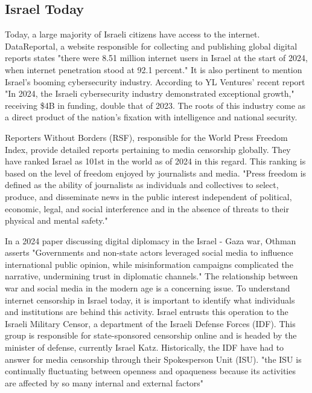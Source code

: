 \subsection{Israel Today}
Today, a large majority of Israeli citizens have access to the internet. DataReportal, a website responsible for collecting and publishing global digital reports states "there were 8.51 million internet users in Israel at the start of 2024, when internet penetration stood at 92.1 percent." \cite{Digital2024Israel} It is also pertinent to mention Israel's booming cybersecurity industry. According to YL Ventures' recent report "In 2024, the Israeli cybersecurity industry demonstrated exceptional growth," receiving \$4B in funding, double that of 2023. The roots of this industry come as a direct product of the nation's fixation with intelligence and national security. 


Reporters Without Borders (RSF), responsible for the World Press Freedom Index, provide detailed reports pertaining to media censorship globally. They have ranked Israel as 101st in the world as of 2024 in this regard. This ranking is based on the level of freedom enjoyed by journalists and media. "Press freedom is defined as the ability of journalists as individuals and collectives to select, produce, and disseminate news in the public interest independent of political, economic, legal, and social interference and in the absence of threats to their physical and mental safety." \cite{rsf_israel} 

In a 2024 paper discussing digital diplomacy in the Israel - Gaza war, Othman asserts "Governments and non-state actors leveraged social media to influence international public opinion, while misinformation campaigns complicated the narrative, undermining trust in diplomatic channels." \cite{Othman2025DigitalDiplomacy} The relationship between war and social media in the modern age is a concerning issue. To understand internet censorship in Israel today, it is important to identify what individuals and institutions are behind this activity. Israel entrusts this operation to the Israeli Military Censor, a department of the Israeli Defense Forces (IDF). This group is responsible for state-sponsored censorship online and is headed by the minister of defense, currently Israel Katz.\cite{MOD_Israel} Historically, the IDF have had to answer for media censorship through their Spokesperson Unit (ISU). "the ISU is continually fluctuating between openness and opaqueness because its activities are affected by so many internal and external factors" \cite{MAGEN2018287} 

